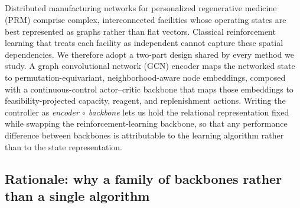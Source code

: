 \documentclass[preprint,review,12pt,nonatbib]{elsarticle}
\providecommand{\DIFadd}[1]{{\protect\color{blue}#1}} %
\providecommand{\DIFdel}[1]{} %
\providecommand{\DIFaddbegin}{} %
\providecommand{\DIFaddend}{} %
\providecommand{\DIFdelbegin}{} %
\providecommand{\DIFdelend}{} %
\providecommand{\DIFscaledelfig}{0.5}
\newlength{\DIFdelgraphicswidth} %
\newlength{\DIFdelgraphicsheight} %
\providecommand{\DIFaddincludegraphics}[2][]{{\color{blue}\fbox{\DIFOincludegraphics[#1]{#2}}}} %
\providecommand{\DIFdelincludegraphics}[2][]{%
\sbox{\DIFdelgraphicsbox}{\DIFOincludegraphics[#1]{#2}}%
\settoboxwidth{\DIFdelgraphicswidth}{\DIFdelgraphicsbox} %
\settoboxtotalheight{\DIFdelgraphicsheight}{\DIFdelgraphicsbox} %
\scalebox{\DIFscaledelfig}{%
\parbox[b]{\DIFdelgraphicswidth}{\usebox{\DIFdelgraphicsbox}\\[-\baselineskip] \rule{\DIFdelgraphicswidth}{0em}}\llap{\resizebox{\DIFdelgraphicswidth}{\DIFdelgraphicsheight}{%
\setlength{\unitlength}{\DIFdelgraphicswidth}%
\begin{picture}(1,1)%
\thicklines\linethickness{2pt} %
{\color[rgb]{1,0,0}\put(0,0){\framebox(1,1){}}}%
{\color[rgb]{1,0,0}\put(0,0){\line( 1,1){1}}}%
{\color[rgb]{1,0,0}\put(0,1){\line(1,-1){1}}}%
\end{picture}%
}\hspace*{3pt}}} %
} %
\DeclareRobustCommand{\DIFaddbegin}{\DIFOaddbegin \let\includegraphics\DIFaddincludegraphics} %
\DeclareRobustCommand{\DIFaddend}{\DIFOaddend \let\includegraphics\DIFOincludegraphics} %
\DeclareRobustCommand{\DIFdelbegin}{\DIFOdelbegin \let\includegraphics\DIFdelincludegraphics} %
\DeclareRobustCommand{\DIFdelend}{\DIFOaddend \let\includegraphics\DIFOincludegraphics} %
\begin{document}
\DIFdelbegin \subsection*{\DIFdel{Introduction to the Method}}

\DIFdel{distributed }\DIFdelend \DIFaddbegin \DIFadd{Distributed }\DIFaddend manufacturing networks for \DIFdelbegin \DIFdel{Personalized Regenerative Medicine }\DIFdelend \DIFaddbegin \DIFadd{personalized regenerative medicine }\DIFaddend (PRM) \DIFdelbegin \DIFdel{involve }\DIFdelend \DIFaddbegin \DIFadd{comprise }\DIFaddend complex, interconnected facilities whose operating states are best represented as graphs rather than flat vectors. Classical reinforcement learning \DIFdelbegin \DIFdel{(RL) models, which treat }\DIFdelend \DIFaddbegin \DIFadd{that treats }\DIFaddend each facility as independent \DIFdelbegin \DIFdel{,
struggle to }\DIFdelend \DIFaddbegin \DIFadd{cannot }\DIFaddend capture these spatial dependencies. \DIFdelbegin \DIFdel{To address this, we integrate the Deep Deterministic
Policy Gradient (DDPG) algorithm with a Graph Convolutional Network (GCN) , enabling the agent to learn joint capacityand transshipment decisions while accounting for network structure}\DIFdelend \DIFaddbegin \DIFadd{We therefore adopt a two-part design shared by every method we study. A graph convolutional network (GCN) encoder maps the networked state to permutation-equivariant, neighborhood-aware node embeddings, composed with a continuous-control actor--critic backbone that maps those embeddings to feasibility-projected capacity, reagent, and replenishment actions. Writing the controller as }\emph{\DIFadd{encoder $\circ$ backbone}} \DIFadd{lets us hold the relational representation fixed while swapping the reinforcement-learning backbone, so that any performance difference between backbones is attributable to the learning algorithm rather than to the state representation}\DIFaddend .

\subsection*{Rationale\DIFdelbegin \DIFdel{for the DDPG-GCN Integration}\DIFdelend \DIFaddbegin \DIFadd{: why a family of backbones rather than a single algorithm}\DIFaddend }
\end{document}
